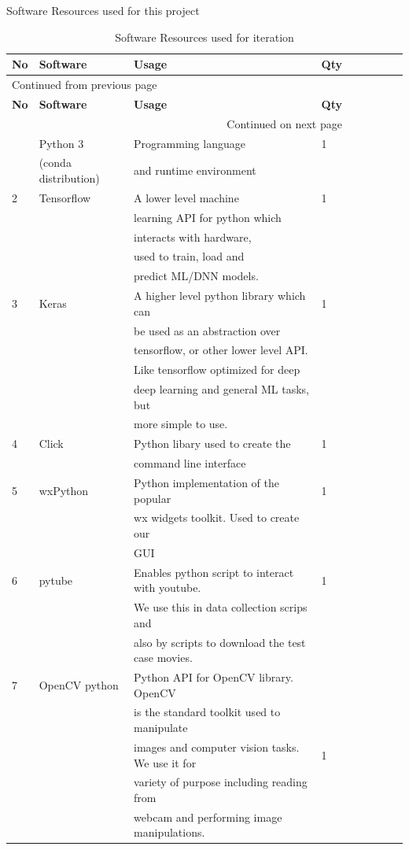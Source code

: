 \documentclass[12pt,a4paper,man]{report}
\begin{document}
Software Resources used for this project
\begin{longtable}{|l|l|l|l|l|l|l|lp{3cm}|}
\caption{\label{table: soft_ressumm}
Software Resources used for iteration}
\\
\hline
\textbf{No} & \textbf{Software} & \textbf{Usage} & \textbf{Qty}\\
\hline
\endfirsthead
\multicolumn{4}{l}{Continued from previous page} \\
\hline

\textbf{No} & \textbf{Software} & \textbf{Usage} & \textbf{Qty} \\

\hline
\endhead
\hline\multicolumn{4}{r}{Continued on next page} \\
\endfoot
\endlastfoot
\hline
1 & Python 3 & Programming language & 1\\
 & (conda distribution) & and runtime environment & \\
\hline
2 & Tensorflow & A lower level machine & 1\\
 &  & learning API for python which & \\
 &  & interacts with hardware, & \\
 &  & used to train, load and & \\
 &  & predict ML/DNN models. & \\
\hline
3 & Keras & A higher level python library which can & 1\\
 &  & be used as an abstraction over & \\
 &  & tensorflow, or other lower level API. & \\
 &  & Like tensorflow optimized for deep & \\
 &  & deep learning and general ML tasks, but & \\
 &  & more simple to use. & \\
\hline
4 & Click & Python libary used to create the & 1\\
 &  & command line interface & \\
\hline
5 & wxPython & Python implementation of the popular & 1\\
 &  & wx widgets toolkit. Used to create our & \\
 &  & GUI & \\
\hline
6 & pytube & Enables python script to interact with youtube. & 1\\
 &  & We use this in data collection scrips and & \\
 &  & also by scripts to download the test case movies. & \\
\hline
7 & OpenCV python & Python API for OpenCV library. OpenCV & \\
 &  & is the standard toolkit used to manipulate & \\
 &  & images and computer vision tasks. We use it for & 1\\
 &  & variety of purpose including reading from & \\
 &  & webcam and performing image manipulations. & \\
\hline
\end{longtable}
\end{document}
